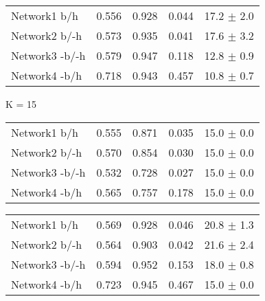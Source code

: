 \begin{table*}[h]
\begin{minipage}[h]{0.45\linewidth}
\begin{tabular}{lrrrr}
\hline
\end{tabular}
\end{minipage}
\hspace{0.8cm}
\begin{minipage}[h]{0.45\linewidth}
\begin{tabular}{lrrrr}
 Network1 b/h        &    0.556 &       0.928 &    0.044 & 17.2 $\pm$ 2.0 \\
 Network2 b/-h      &    0.573 &       0.935 &    0.041 & 17.6 $\pm$ 3.2    \\
 Network3 -b/-h      &    0.579 &       0.947 &    0.118 & 12.8 $\pm$ 0.9 \\
 Network4 -b/h      &    0.718 &       0.943 &    0.457 & 10.8 $\pm$ 0.7 \\

\hline
\end{tabular}
\end{minipage}


	\begin{minipage}[h]{0.45\linewidth} 
K = 15
\begin{tabular}{lrrrr}
 Network1 b/h          &    0.555 &       0.871 &    0.035 & 15.0 $\pm$ 0.0 \\
 Network2 b/-h        &    0.570 &       0.854 &    0.030 & 15.0 $\pm$ 0.0 \\
 Network3 -b/-h        &    0.532 &       0.728 &    0.027 & 15.0 $\pm$ 0.0 \\
 Network4 -b/h        &    0.565 &       0.757 &    0.178 & 15.0 $\pm$ 0.0 \\

\hline
\end{tabular}
\end{minipage}
\hspace{0.8cm}
\begin{minipage}[h]{0.45\linewidth}
\begin{tabular}{lrrrr}
 Network1 b/h        &    0.569 &       0.928 &    0.046 & 20.8 $\pm$ 1.3 \\
 Network2 b/-h      &    0.564 &       0.903 &    0.042 & 21.6 $\pm$ 2.4 \\
 Network3 -b/-h      &    0.594 &       0.952 &    0.153 & 18.0 $\pm$ 0.8 \\
 Network4 -b/h      &    0.723 &       0.945 &    0.467 & 15.0 $\pm$ 0.0    \\

\hline
\end{tabular}
\end{minipage}


\end{table*}
